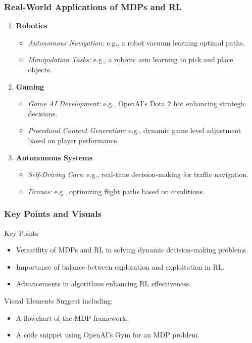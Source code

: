 \documentclass[aspectratio=169]{beamer}
\begin{document}
\begin{frame}[fragile]
    \frametitle{Real-World Applications of MDPs and RL}
    \begin{enumerate}
        \item \textbf{Robotics}
            \begin{itemize}
                \item \textit{Autonomous Navigation:} e.g., a robot vacuum learning optimal paths.
                \item \textit{Manipulation Tasks:} e.g., a robotic arm learning to pick and place objects.
            \end{itemize}
        \item \textbf{Gaming}
            \begin{itemize}
                \item \textit{Game AI Development:} e.g., OpenAI’s Dota 2 bot enhancing strategic decisions.
                \item \textit{Procedural Content Generation:} e.g., dynamic game level adjustment based on player performance.
            \end{itemize}
        \item \textbf{Autonomous Systems}
            \begin{itemize}
                \item \textit{Self-Driving Cars:} e.g., real-time decision-making for traffic navigation.
                \item \textit{Drones:} e.g., optimizing flight paths based on conditions.
            \end{itemize}
    \end{enumerate}
\end{frame}

\begin{frame}[fragile]
    \frametitle{Key Points and Visuals}
    \begin{block}{Key Points}
        \begin{itemize}
            \item Versatility of MDPs and RL in solving dynamic decision-making problems.
            \item Importance of balance between exploration and exploitation in RL.
            \item Advancements in algorithms enhancing RL effectiveness.
        \end{itemize}
    \end{block}
    
    \begin{block}{Visual Elements}
        Suggest including:
        \begin{itemize}
            \item A flowchart of the MDP framework.
            \item A code snippet using OpenAI’s Gym for an MDP problem.
        \end{itemize}
    \end{block}
\end{frame}
\end{document}
